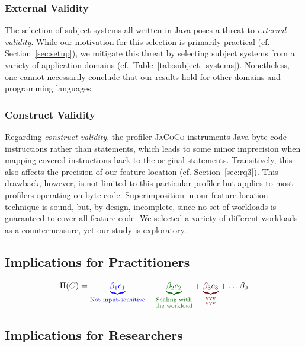 {\subsubsection{External Validity}\label{sec:external_validity}
The selection of subject systems all written in Java poses a threat to \emph{external validity}. While our motivation for this selection is primarily practical (cf. Section~\ref{sec:setup}), we mitigate this threat by selecting subject systems from a variety of application domains (cf.~Table~\ref{tab:subject_systems}). Nonetheless, one cannot necessarily conclude that our results hold for other domains and programming languages. 

\subsubsection{Construct Validity}\label{sec:construct_validity}
Regarding \emph{construct validity}, the profiler \textsc{JaCoCo} instruments Java byte code instructions rather than statements, which leads to some minor imprecision when mapping covered instructions back to the original statements. Transitively, this also affects the precision of our feature location (cf. Section~\ref{sec:rq3}). This drawback, however, is not limited to this particular profiler but applies to most profilers operating on byte code. 
Superimposition in our feature location technique is sound, but, by design, incomplete, since no set of workloads is guaranteed to cover all feature code. We selected a variety of different workloads as a countermeasure, yet our study is exploratory. 

\subsection{Implications for Practitioners}

\begin{equation}
	\Pi(C) = {\color{blue}\underbrace{\beta_1 c_1}_{\text{Not input-sensitive}}} + {\color{green!40!black}\underbrace{\beta_2 c_2}_{\substack{\text{Scaling with}\\ \text{the workload}}} } + {\color{red!40!black}\underbrace{\beta_3 c_3}_{
			\substack{\text{vvv}\\\text{vvv}}	
	}} +\ldots \beta_0
\end{equation}

\subsection{Implications for Researchers}

}
